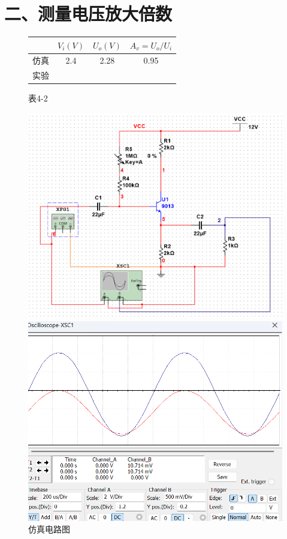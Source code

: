 \documentclass[a4paper,10pt,notitlepage]{article}
\begin{document}
	\section*{二、测量电压放大倍数}
		\begin{figure}[h]
		\centering
		\begin{tabular}{|c|c|c|c|}
			\hline
			& $V_i(V)$ & $U_o(V)$ & $A_v=U_o/U_i$ \\
			\hline
			仿真 & 2.4 & 2.28 &  0.95 \\
			\hline
			实验 & \quad & \quad & \qquad  \\
			\hline
		\end{tabular}
		\caption*{表4-2 }
	\end{figure}
		\begin{figure}[h]
		\raggedright
		\begin{minipage}{0.3\textwidth}
			\centering
			\includegraphics[width=\textwidth]{4.png}
			\caption*{仿真电路图}
		\end{minipage}
		\qquad
		\begin{minipage}{0.28\textwidth}
			\centering
			\includegraphics[width=\textwidth]{5.png}

\end{minipage}
\end{figure}
\end{document}
